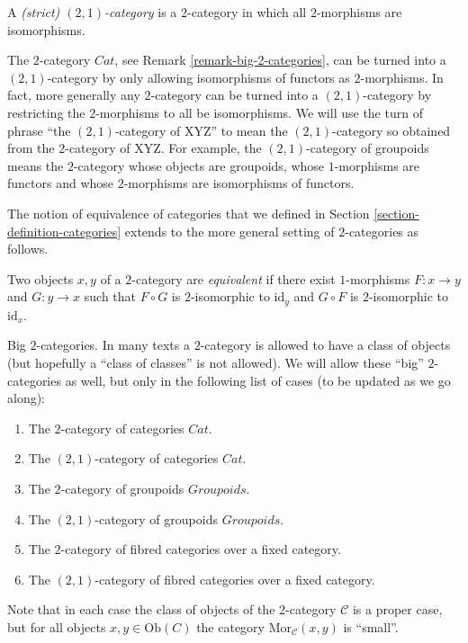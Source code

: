 \begin{definition}
\label{definition-2-1-category}
A {\it (strict) $(2,1)$-category} is a $2$-category in which all
$2$-morphisms are isomorphisms.
\end{definition}

\begin{example}
\label{example-2-1-category-of-categories}
The $2$-category $\textit{Cat}$,
see Remark \ref{remark-big-2-categories}, can be turned into a
$(2,1)$-category by only allowing isomorphisms of functors
as $2$-morphisms. In fact, more generally any $2$-category
can be turned into a $(2,1)$-category by restricting
the $2$-morphisms to all be isomorphisms. We will use the turn of phrase
``the $(2,1)$-category of XYZ'' to mean the $(2,1)$-category
so obtained from the $2$-category of XYZ. For example,
the $(2,1)$-category of groupoids means the
$2$-category whose objects are groupoids, whose
$1$-morphisms are functors and whose $2$-morphisms are
isomorphisms of functors.
\end{example}

\noindent
The notion of equivalence of categories that we defined in Section
\ref{section-definition-categories} extends to the more general setting of
$2$-categories as follows.

\begin{definition}
\label{definition-equivalence}
Two objects $x,y$ of a $2$-category are {\it equivalent} if there exist 
$1$-morphisms $F : x \to y$ and $G : y \to x$ such that $F \circ G$ is 
$2$-isomorphic to $\text{id}_y$ and $G \circ F$ is $2$-isomorphic to 
$\text{id}_x$.
\end{definition}

\begin{remark} 
\label{remark-big-2-categories}
Big $2$-categories.
In many texts a $2$-category is allowed to have a class of
objects (but hopefully a ``class of classes'' is not allowed).
We will allow these ``big'' $2$-categories as well, but only
in the following list of cases (to be updated as we go along):
\begin{enumerate}
\item The $2$-category of categories $\textit{Cat}$.
\item The $(2,1)$-category of categories $\textit{Cat}$.
\item The $2$-category of groupoids $\textit{Groupoids}$.
\item The $(2,1)$-category of groupoids $\textit{Groupoids}$.
\item The $2$-category of fibred categories over a fixed category.
\item The $(2,1)$-category of fibred categories over a fixed category.
\end{enumerate}
Note that in each case the class of objects of the $2$-category
$\mathcal{C}$ is a proper case, but for all objects $x,y \in \text{Ob}(C)$
the category $\text{Mor}_{\mathcal{C}}(x, y)$ is ``small''.
\end{remark}

